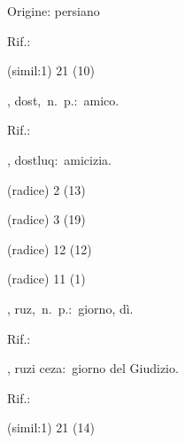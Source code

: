 \begin{glossario}{Origine: persiano}
\begin{subvocedue}
\item[Rif.:] 
\end{subvocedue}
\begin{subvocedue}
\item[(simil:1)]   21 (10)
\end{subvocedue}
\item[{\color{colorlowref}\spzrl{dUst}},] {\sf dost},\ n.\ p.:\ amico.
\begin{subvocedue}
\item[Rif.:] 
\end{subvocedue}
\begin{subvocedue}
\item[\subglossariobullet] , {\sf dostluq}:\ amicizia.
\item[(radice)]   2 (13)
\item[(radice)]   3 (19)
\item[(radice)]   12 (12)
\item[(radice)]   11 (1)
\end{subvocedue}
\item[{\color{colorlowref}\spzrl{rUz}},] {\sf ruz},\ n.\ p.:\ giorno, dì.
\begin{subvocedue}
\item[Rif.:] 
\end{subvocedue}
\begin{subvocedue}
\item[\subglossariobullet] , {\sf ruzi ceza}:\ giorno del Giudizio.
\begin{subvocedue}
\item[Rif.:] 
\end{subvocedue}
\item[(simil:1)]   21 (14)
\end{subvocedue}



\end{glossario}
